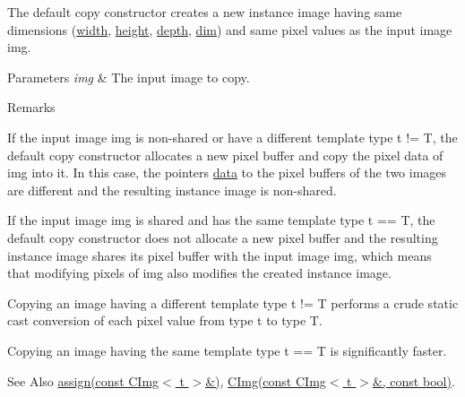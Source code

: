 The default copy constructor creates a new instance image having same dimensions (\hyperlink{structcimg__library_1_1_c_img_a5fb74a7776210bb99fd6755319ade13f}{width}, \hyperlink{structcimg__library_1_1_c_img_a30d575fd18ae525e507315de71b4806a}{height}, \hyperlink{structcimg__library_1_1_c_img_a982d5d1e153477adf7f851106fe8ee3a}{depth}, \hyperlink{structcimg__library_1_1_c_img_ac9648dfe0a26d58e6e0030a3dbca234e}{dim}) and same pixel values as the input image {\ttfamily img}. 
\begin{DoxyParams}{Parameters}
{\em img} & The input image to copy. \\
\hline
\end{DoxyParams}
\begin{DoxyRemark}{Remarks}

\begin{DoxyItemize}
\item If the input image {\ttfamily img} is non-\/shared or have a different template type {\ttfamily t} != {\ttfamily T}, the default copy constructor allocates a new pixel buffer and copy the pixel data of {\ttfamily img} into it. In this case, the pointers \hyperlink{structcimg__library_1_1_c_img_a54f252b86f19b2217aef3ec9e1e2e013}{data} to the pixel buffers of the two images are different and the resulting instance image is non-\/shared.
\item If the input image {\ttfamily img} is shared and has the same template type {\ttfamily t} == {\ttfamily T}, the default copy constructor does not allocate a new pixel buffer and the resulting instance image shares its pixel buffer with the input image {\ttfamily img}, which means that modifying pixels of {\ttfamily img} also modifies the created instance image.
\item Copying an image having a different template type {\ttfamily t} != {\ttfamily T} performs a crude static cast conversion of each pixel value from type {\ttfamily t} to type {\ttfamily T}.
\item Copying an image having the same template type {\ttfamily t} == {\ttfamily T} is significantly faster. 
\end{DoxyItemize}
\end{DoxyRemark}
\begin{DoxySeeAlso}{See Also}
\hyperlink{structcimg__library_1_1_c_img_a7adf0edeca1ab85b0d23f3900ca51fb6}{assign(const C\-Img$<$ t $>$\&)}, \hyperlink{structcimg__library_1_1_c_img_ab2bc3f0c5730c1f57dfb8b920954444f}{C\-Img(const C\-Img$<$ t $>$\&, const bool)}. 
\end{DoxySeeAlso}
